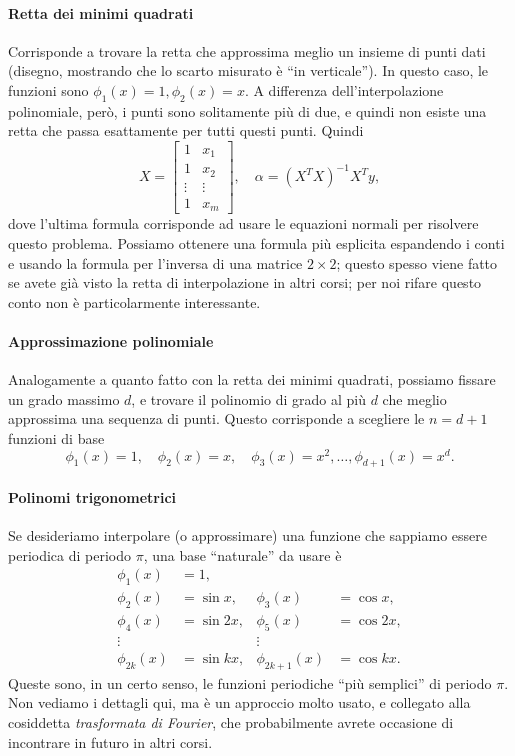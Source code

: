 \documentclass[a4paper]{report}
\theoremstyle{definiton}
\theoremstyle{remark}
\begin{document}
\paragraph{Retta dei minimi quadrati} Corrisponde a trovare la retta che approssima meglio un insieme di punti dati (disegno, mostrando che lo scarto misurato è ``in verticale''). In questo caso, le funzioni sono $\phi_1(x) = 1, \phi_2(x) = x$. A differenza dell'interpolazione polinomiale, però, i punti sono solitamente più di due, e quindi non esiste una retta che passa esattamente per tutti questi punti. Quindi
\[
X = \begin{bmatrix}
    1 & x_1\\
    1 & x_2\\
    \vdots & \vdots\\
    1 & x_m
\end{bmatrix}, \quad \alpha = (X^TX)^{-1} X^T y,
\]
dove l'ultima formula corrisponde ad usare le equazioni normali per risolvere questo problema. Possiamo ottenere una formula più esplicita espandendo i conti e usando la formula per l'inversa di una matrice $2\times 2$; questo spesso viene fatto se avete già visto la retta di interpolazione in altri corsi; per noi rifare questo conto non è particolarmente interessante.


\paragraph{Approssimazione polinomiale}
Analogamente a quanto fatto con la retta dei minimi quadrati, possiamo fissare un grado massimo $d$, e trovare il polinomio di grado al più $d$ che meglio approssima una sequenza di punti. Questo corrisponde a scegliere le $n = d+1$ funzioni di base
\begin{equation} \label{basepolinomi}
    \phi_1(x) = 1, \quad \phi_2(x) = x, \quad \phi_3(x) = x^2, \dots, \phi_{d+1}(x) = x^{d}.    
\end{equation}

\paragraph{Polinomi trigonometrici} Se desideriamo interpolare (o approssimare) una funzione che sappiamo essere periodica di periodo $\pi$, una base ``naturale'' da usare è
\begin{align*}
\phi_1(x) &= 1,\\
\phi_2(x) &= \sin x, & \phi_3(x) &= \cos x,\\
\phi_4(x) &= \sin 2x, & \phi_5(x) &= \cos 2x,\\
\vdots & & \vdots &\\
\phi_{2k}(x) &= \sin kx, & \phi_{2k+1}(x) &= \cos kx.
\end{align*}
Queste sono, in un certo senso, le funzioni periodiche ``più semplici'' di periodo $\pi$. Non vediamo i dettagli qui, ma è un approccio molto usato, e collegato alla cosiddetta \emph{trasformata di Fourier}, che probabilmente avrete occasione di incontrare in futuro in altri corsi.
\end{document}
